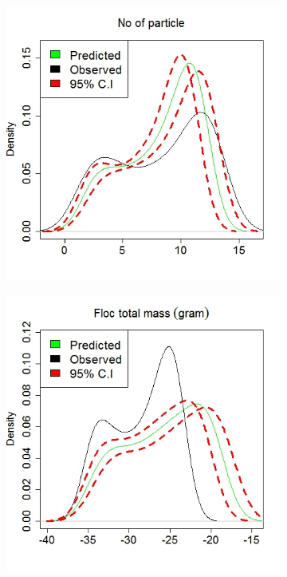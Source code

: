 \begin{figure}[!ht]
\begin{subfigure}[b]{.60\textwidth}
\end{subfigure}\vspace*{-.5em}
\begin{subfigure}[b]{.6\textwidth}
\includegraphics[width=1\textwidth]{p1a1/p1a1_4}
\end{subfigure}\hspace*{-.5em}
\centering
\begin{subfigure}[b]{.60\textwidth}
\includegraphics[width=1\textwidth]{p1a1/p1a1_5}

\end{subfigure}
\end{figure}

